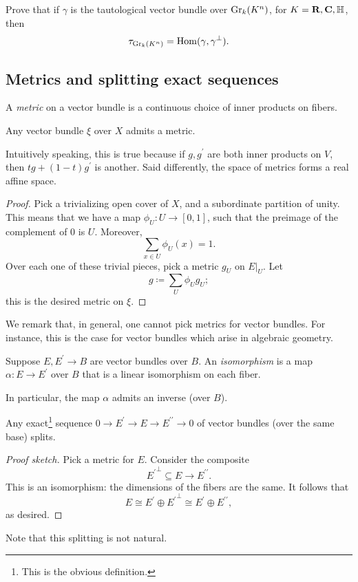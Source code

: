 \begin{exercise}
    Prove that if $\gamma$ is the tautological vector bundle over
    $\mathrm{Gr}_k(K^n)$, for $K=\mathbf R,\mathbf C,\mathbb H$, then
    $$\tau_{\mathrm{Gr}_k(K^n)} = \operatorname{Hom}(\gamma,\gamma^\perp).$$
\end{exercise}
\subsection{Metrics and splitting exact sequences}
A \emph{metric} on a vector bundle is a continuous choice of inner products on
fibers.
\begin{lemma}
    Any vector bundle $\xi$ over $X$ admits a metric.
\end{lemma}
Intuitively speaking, this is true because if $g,g^\prime$ are both inner
products on $V$, then $tg+(1-t)g^\prime$ is another. Said differently, the
space of metrics forms a real affine space.
\begin{proof}
    Pick a trivializing open cover of $X$, and a subordinate partition of
    unity. This means that we have a map $\phi_U:U\to [0,1]$, such that the
    preimage of the complement of $0$ is $U$. Moreover,
    $$\sum_{x\in U} \phi_U(x) = 1.$$
    Over each one of these trivial pieces, pick a metric $g_U$ on $E|_{U}$.
    Let
    $$g \coloneqq \sum_{U}\phi_U g_U;$$
    this is the desired metric on $\xi$.
\end{proof}
We remark that, in general, one cannot pick metrics for vector bundles. For
instance, this is the case for vector bundles which arise in algebraic
geometry.
\begin{definition}
    Suppose $E,E^\prime\to B$ are vector bundles over $B$. An
    \emph{isomorphism} is a map $\alpha:E\to E^\prime$ over $B$ that is a
    linear isomorphism on each fiber.
\end{definition}
In particular, the map $\alpha$ admits an inverse (over $B$).
\begin{corollary}\label{split}
    Any exact\footnote{This is the obvious definition.} sequence $0\to
    E^\prime\to E\to E^{\prime\prime}\to 0$ of vector bundles (over the same
    base) splits.
\end{corollary}
\begin{proof}[Proof sketch]
    Pick a metric for $E$. Consider the composite
    $${E^\prime}^\perp\subseteq E\to E^{\prime\prime}.$$
    This is an isomorphism: the dimensions of the fibers are the same. It
    follows that
    $$E\cong E^\prime\oplus {E^\prime}^{\perp}\cong E^\prime\oplus
    E^{\prime\prime},$$
    as desired.
\end{proof}
Note that this splitting is not natural.
